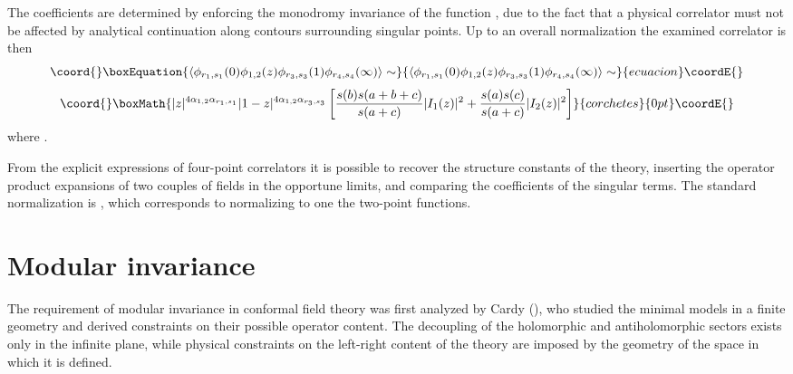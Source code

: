 \documentclass[a4paper,12pt]{report}
\begin{document}
The coefficients \coordHE{} are determined by enforcing the monodromy invariance of the function \coordHE{}, due to the
fact that a physical correlator must not be affected by analytical continuation along contours surrounding
singular points. Up to an overall normalization the examined correlator is then
\begin{equation}\coord{}\boxEquation{
\langle\phi_{r_{1},s_{1}}(0)\phi_{1,2}(z)\phi_{r_{3},s_{3}}(1)\phi_{r_{4},s_{4}}(\infty)\rangle\sim
}{
\langle\phi_{r_{1},s_{1}}(0)\phi_{1,2}(z)\phi_{r_{3},s_{3}}(1)\phi_{r_{4},s_{4}}(\infty)\rangle\sim
}{ecuacion}\coordE{}\end{equation}
\begin{displaymath}\coord{}\boxMath{
|z|^{4\alpha_{1,2}\alpha_{r_{1},s_{1}}}|1-z|^{4\alpha_{1,2}\alpha_{r_{3},s_{3}}}\left[\frac{s(b)s(a+b+c)}{s(a+c)}|I_{1}(z)|^{2}+\frac{s(a)s(c)}{s(a+c)}|I_{2}(z)|^{2}\right]
}{corchetes}{0pt}\coordE{}\end{displaymath}
where \coordHE{}.

\vspace{0.5cm}

From the explicit expressions of four-point correlators it is possible to recover the structure constants of the
theory, inserting the operator product expansions of two couples of fields in the opportune limits, and comparing
the coefficients of the singular terms. The standard normalization is \coordHE{}, which corresponds to
normalizing to one the two-point functions.

\vspace{1cm}

\section{Modular invariance}

The requirement of modular invariance in conformal field theory was first analyzed by Cardy (\cite{cardymod}), who
studied the minimal models in a finite geometry and derived constraints on their possible operator content. The
decoupling of the holomorphic and antiholomorphic sectors exists only in the infinite plane, while physical
constraints on the left-right content of the theory are imposed by the geometry of the space in which it is
defined.
\end{document}
